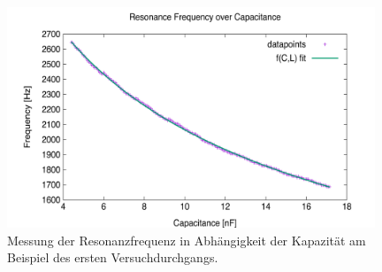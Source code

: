 \documentclass{article}
\begin{document}
    \begin{figure}[h]
        \centering
        \includegraphics[width=11cm]{../Bilddateien/Messung1_Resonance_Freq_vs_Capacitance.png}
        \caption{Messung der Resonanzfrequenz in Abhängigkeit der Kapazität am Beispiel des ersten Versuchdurchgangs.}
    \end{figure}
\end{document}
